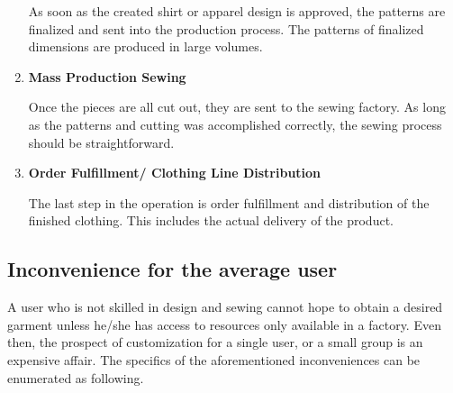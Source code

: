 \documentclass{article}
\begin{document}
\begin{enumerate}
As soon as the created shirt or apparel design is approved, the patterns are finalized and sent into the production process. The patterns of finalized dimensions are produced in large volumes.

    \item \textbf{Mass Production Sewing}

Once the pieces are all cut out, they are sent to the sewing factory. As long as the patterns and cutting was accomplished correctly, the sewing process should be straightforward. 

    \item \textbf{Order Fulfillment/ Clothing Line Distribution}

The last step in the operation is order fulfillment and distribution of the finished clothing. This includes the actual delivery of the product.
\end{enumerate}
 
	\subsection{Inconvenience for the average user}
	
	A user who is not skilled in design and sewing cannot hope to obtain a desired garment unless he/she has access to resources only available in a factory. Even then, the prospect of customization for a single user, or a small group is an expensive affair. The specifics of the aforementioned inconveniences can be enumerated as following.
	
\end{document}
